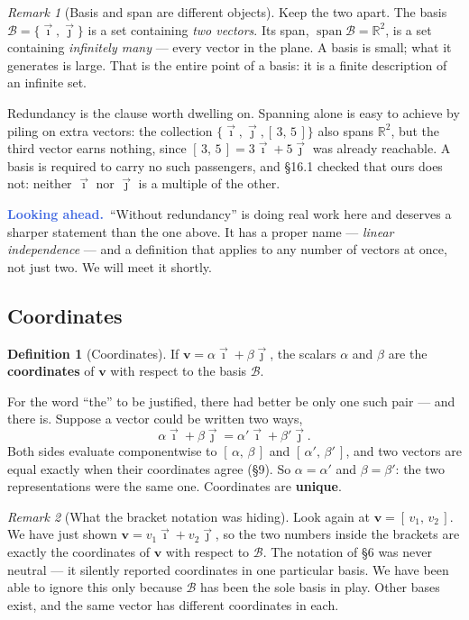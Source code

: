\documentclass[11pt]{article}
\theoremstyle{definition}
\newtheorem{defn}{Definition}[section]
\theoremstyle{remark}
\newtheorem*{rmk}{Remark}
\newcommand{\lookahead}{\par\smallskip\noindent
  \textbf{\sffamily\textcolor{RoyalBlue}{Looking ahead.}}\ \ignorespaces}
\newcommand{\R}{\mathbb{R}}
\newcommand{\vc}[1]{\mathbf{#1}}
\newcommand{\ivec}{\vec{\imath}}
\newcommand{\jvec}{\vec{\jmath}}
\newcommand{\bas}{\mathcal{B}}
\DeclareMathOperator{\spanop}{span}   %
\begin{document}
\begin{rmk}[Basis and span are different objects]
Keep the two apart. The basis $\bas=\{\ivec,\jvec\}$ is a set containing
\emph{two vectors}. Its span, $\spanop\bas=\R^{2}$, is a set containing
\emph{infinitely many} --- every vector in the plane. A basis is small; what it
generates is large. That is the entire point of a basis: it is a finite
description of an infinite set.
\end{rmk}

\noindent Redundancy is the clause worth dwelling on. Spanning alone is easy to
achieve by piling on extra vectors: the collection
$\{\ivec,\jvec,[\,3,\,5\,]\}$ also spans $\R^{2}$, but the third vector earns
nothing, since $[\,3,\,5\,]=3\ivec+5\jvec$ was already reachable. A basis is
required to carry no such passengers, and \S16.1 checked that ours does not:
neither $\ivec$ nor $\jvec$ is a multiple of the other.

\lookahead ``Without redundancy'' is doing real work here and deserves a
sharper statement than the one above. It has a proper name --- \emph{linear
independence} --- and a definition that applies to any number of vectors at
once, not just two. We will meet it shortly.

\subsection{Coordinates}
\begin{defn}[Coordinates]
If $\vc{v}=\alpha\ivec+\beta\jvec$, the scalars $\alpha$ and $\beta$ are the
\textbf{coordinates} of $\vc{v}$ with respect to the basis $\bas$.
\end{defn}

\noindent For the word ``the'' to be justified, there had better be only one
such pair --- and there is. Suppose a vector could be written two ways,
\[
  \alpha\ivec + \beta\jvec = \alpha'\ivec + \beta'\jvec .
\]
Both sides evaluate componentwise to $[\,\alpha,\,\beta\,]$ and
$[\,\alpha',\,\beta'\,]$, and two vectors are equal exactly when their
coordinates agree (\S9). So $\alpha=\alpha'$ and $\beta=\beta'$: the two
representations were the same one. Coordinates are \textbf{unique}.

\begin{rmk}[What the bracket notation was hiding]
Look again at $\vc{v}=[\,v_1,\,v_2\,]$. We have just shown
$\vc{v}=v_1\ivec+v_2\jvec$, so the two numbers inside the brackets are exactly
the coordinates of $\vc{v}$ with respect to $\bas$. The notation of \S6 was
never neutral --- it silently reported coordinates in one particular basis. We
have been able to ignore this only because $\bas$ has been the sole basis in
play. Other bases exist, and the same vector has different coordinates in each.
\end{rmk}
\end{document}
